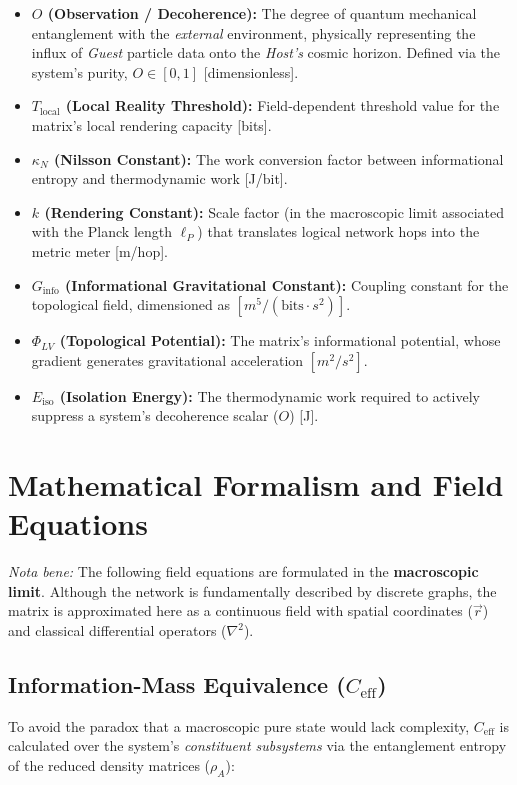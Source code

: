 \documentclass[12pt,a4paper]{article}
\begin{document}
\begin{itemize}
    
    \item \textbf{$O$ (Observation / Decoherence):} The degree of quantum mechanical entanglement with the \textit{external} environment, physically representing the influx of \textit{Guest} particle data onto the \textit{Host's} cosmic horizon. Defined via the system's purity, $O \in [0,1]$ [dimensionless].

    \item \textbf{$T_{\mathrm{local}}$ (Local Reality Threshold):} Field-dependent threshold value for the matrix's local rendering capacity [bits].
    \item \textbf{$\kappa_N$ (Nilsson Constant):} The work conversion factor between informational entropy and thermodynamic work [J/bit].
    \item \textbf{$k$ (Rendering Constant):} Scale factor (in the macroscopic limit associated with the Planck length $\ell_P$) that translates logical network hops into the metric meter [m/hop].
    \item \textbf{$G_{\mathrm{info}}$ (Informational Gravitational Constant):} Coupling constant for the topological field, dimensioned as $[m^5 / (\text{bits} \cdot s^2)]$.
    \item \textbf{$\Phi_{LV}$ (Topological Potential):} The matrix's informational potential, whose gradient generates gravitational acceleration $[m^2 / s^2]$.
        \item \textbf{$E_{\mathrm{iso}}$ (Isolation Energy):} The thermodynamic work required to actively suppress a system's decoherence scalar ($O$) [J].

\end{itemize}

\section{Mathematical Formalism and Field Equations}

\textit{Nota bene:} The following field equations are formulated in the \textbf{macroscopic limit}. Although the network is fundamentally described by discrete graphs, the matrix is approximated here as a continuous field with spatial coordinates ($\vec{r}$) and classical differential operators ($\nabla^2$).

\subsection{Information-Mass Equivalence ($C_{\mathrm{eff}}$)}
To avoid the paradox that a macroscopic pure state would lack complexity, $C_{\mathrm{eff}}$ is calculated over the system's \textit{constituent subsystems} via the entanglement entropy of the reduced density matrices ($\rho_A$):
\end{document}
